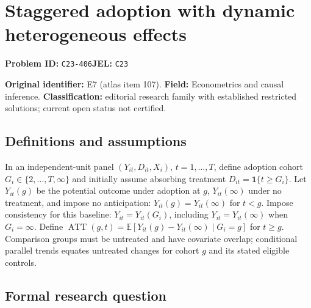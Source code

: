 \documentclass[11pt,a4paper]{article}
\begin{document}
\section*{Staggered adoption with dynamic heterogeneous effects}
\textbf{Problem ID:} \texttt{C23-406}\quad \textbf{JEL:} \texttt{C23}\par
\label{problem:OP-0107}
\label{atlas:prob:E7}

\noindent\textbf{Original identifier:} E7 (atlas item 107). \textbf{Field:} Econometrics and causal inference. \textbf{Classification:} editorial research family with established restricted solutions; current open status not certified.

\subsection*{Definitions and assumptions}

In an independent-unit panel $(Y_{it},D_{it},X_i)$, $t=1,\ldots,T$, define adoption cohort $G_i\in\{2,\ldots,T,\infty\}$ and initially assume absorbing treatment $D_{it}=\mathbf1\{t\ge G_i\}$. Let $Y_{it}(g)$ be the potential outcome under adoption at $g$, $Y_{it}(\infty)$ under no treatment, and impose no anticipation: $Y_{it}(g)=Y_{it}(\infty)$ for $t<g$. Impose consistency for this baseline: $Y_{it}=Y_{it}(G_i)$, including $Y_{it}=Y_{it}(\infty)$ when $G_i=\infty$. Define $\operatorname{ATT}(g,t)=\mathbb E[Y_{it}(g)-Y_{it}(\infty)\mid G_i=g]$ for $t\ge g$. Comparison groups must be untreated and have covariate overlap; conditional parallel trends equates untreated changes for cohort $g$ and its stated eligible controls.

\subsection*{Formal research question}
\end{document}

